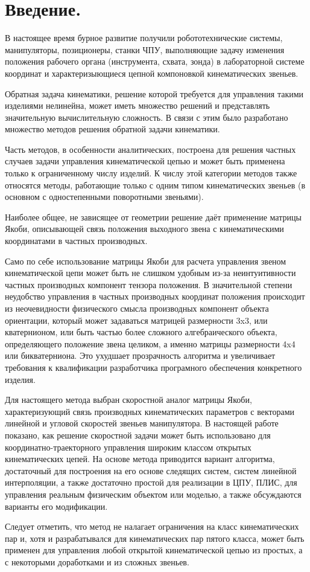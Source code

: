 \section{Введение.}

В настоящее время бурное развитие получили робототехнические системы, манипуляторы, позиционеры, станки ЧПУ, выполняющие задачу изменения положения рабочего органа (инструмента, схвата, зонда) в лабораторной системе координат и характеризыющиеся цепной компоновкой кинематических звеньев.

Обратная задача кинематики, решение которой требуется для управления такими изделиями нелинейна, может иметь множество решений и представлять значительную вычислительную сложность. В связи с этим было разработано множество методов решения обратной задачи кинематики.

Часть методов, в особенности аналитических, построена для решения частных случаев задачи управления кинематической цепью и может быть применена только к ограниченному числу изделий. К числу этой категории методов также относятся методы, работающие только с одним типом кинематических звеньев (в основном с одностепенными поворотными звеньями).

Наиболее общее, не зависящее от геометрии решение даёт применение матрицы Якоби, описывающей связь положения выходного звена с кинематическими координатами в частных производных.

Само по себе использование матрицы Якоби для расчета управления звеном кинематической цепи может быть не слишком удобным из-за неинтуитивности частных производных компонент тензора положения. В значительной степени неудобство управления в частных производных координат положения происходит из неочевидности физического смысла производных компонент объекта ориентации, который может задаваться матрицей размерности 3x3, или кватернионом, или быть частью более сложного алгебраического объекта, определяющего положение звена целиком, а именно матрицы размерности 4x4 или бикватерниона. Это ухудшает прозрачность алгоритма и увеличивает требования к квалификации разработчика програмного обеспечения конкретного изделия.

Для настоящего метода выбран скоростной аналог матрицы Якоби, характеризующий связь производных кинематических параметров с векторами линейной и угловой скоростей звеньев манипулятора. В настоящей работе показано, как решение скоростной задачи может быть использовано для координатно-траекторного управления широким классом открытых кинематических цепей. На основе метода приводится вариант алгоритма, достаточный для построения на его основе следящих систем, систем линейной интерполяции, а также достаточно простой для реализации в ЦПУ, ПЛИС, для управления реальным физическим объектом или моделью, а также обсуждаются варианты его модификации.

Следует отметить, что метод не налагает ограничения на класс кинематических пар и, хотя и разрабатывался для кинематических пар пятого класса, может быть применен для управления любой открытой кинематической цепью из простых, а с некоторыми доработками и из сложных звеньев.
